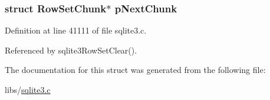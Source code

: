 \subsubsection[{p\+Next\+Chunk}]{\setlength{\rightskip}{0pt plus 5cm}struct {\bf Row\+Set\+Chunk}$\ast$ p\+Next\+Chunk}\label{struct_row_set_chunk_a2093666264de5b293f2a4d1b8c53d257}


Definition at line 41111 of file sqlite3.\+c.



Referenced by sqlite3\+Row\+Set\+Clear().



The documentation for this struct was generated from the following file\+:\begin{DoxyCompactItemize}
\item 
libs/\hyperlink{sqlite3_8c}{sqlite3.\+c}\end{DoxyCompactItemize}
